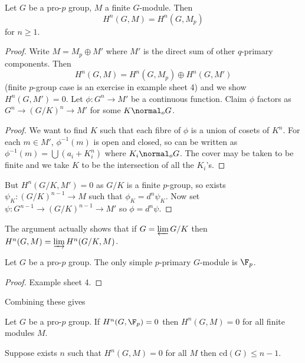\documentclass[a4paper]{article}
\begin{document}
\begin{proposition}
  Let \(G\) be a pro-\(p\) group, \(M\) a finite \(G\)-module. Then
  \[
    H^n(G, M) = H^n(G, M_p)
  \]
  for \(n \geq 1\).
\end{proposition}

\begin{proof}
  Write \(M = M_p \oplus M'\) where \(M'\) is the direct sum of other \(q\)-primary components. Then
  \[
    H^n(G, M) = H^n(G, M_p) \oplus H^n(G, M')
  \]
  (finite \(p\)-group case is an exercise in example sheet 4) and we show \(H^n(G, M') = 0\). Let \(\phi: G^n \to M'\) be a continuous function. Claim \(\phi\) factors as \(G^n \to (G/K)^n \to M'\) for some \(K \normal_o G\).

  \begin{proof}
    We want to find \(K\) such that each fibre of \(\phi\) is a union of cosets of \(K^n\). For each \(m \in M'\), \(\phi^{-1}(m)\) is open and closed, so can be written as \(\phi^{-1}(m) = \bigcup (a_i + K_i^n)\) where \(K_i \normal_o G\). The cover may be taken to be finite and we take \(K\) to be the intersection of all the \(K_i\)'s.
  \end{proof}

  But \(H^n(G/K, M') = 0\) as \(G/K\) is a finite \(p\)-group, so exists \(\psi_K: (G/K)^{n - 1} \to M\) such that \(\phi_K = d^n\psi_K\). Now set \(\psi: G^{n - 1} \to (G/K)^{n - 1} \to M'\) so \(\phi = d^n \psi\).
\end{proof}

\begin{remark}
  The argument actually shows that if \(G = \varprojlim G/K\) then \(H^n(G, M) = \varinjlim H^n(G/K, M)\).
\end{remark}

\begin{proposition}
  Let \(G\) be a pro-\(p\) group. The only simple \(p\)-primary \(G\)-module is \(\F_p\).
\end{proposition}

\begin{proof}
  Example sheet 4.
\end{proof}

Combining these gives

\begin{proposition}
  Let \(G\) be a pro-\(p\) group. If \(H^n(G, \F_p) = 0\) then \(H^n(G, M) = 0\) for all finite modules \(M\).
\end{proposition}

\begin{proposition}
  Suppose exists \(n\) such that \(H^n(G, M) = 0\) for all \(M\) then \(\mathrm{cd}(G) \leq n - 1\).
\end{proposition}
\end{document}
